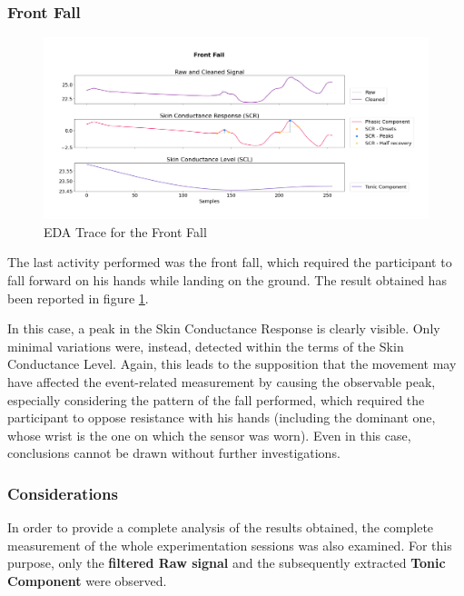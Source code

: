 \subsubsection{Front Fall}\label{subsubsec:front-fall}

\begin{figure}[h]
    \centering
    \includegraphics[width=\textwidth]{./images/movisens/Front.png}
    \caption{EDA Trace for the Front Fall}
    \label{fig:movisens-front}
\end{figure}

The last activity performed was the front fall, which required the participant to fall forward on his hands while landing on the ground. The result obtained has been reported in figure \ref{fig:movisens-front}.

In this case, a peak in the Skin Conductance Response is clearly visible. Only minimal variations were, instead, detected within the terms of the Skin Conductance Level. Again, this leads to the supposition that the movement may have affected the event-related measurement by causing the observable peak, especially considering the pattern of the fall performed, which required the participant to oppose resistance with his hands (including the dominant one, whose wrist is the one on which the sensor was worn). Even in this case, conclusions cannot be drawn without further investigations.

\subsubsection{Considerations}\label{subsubsec:further-observations}

In order to provide a complete analysis of the results obtained, the complete measurement of the whole experimentation sessions was also examined. For this purpose, only the \textbf{filtered Raw signal} and the subsequently extracted \textbf{Tonic Component} were observed.

